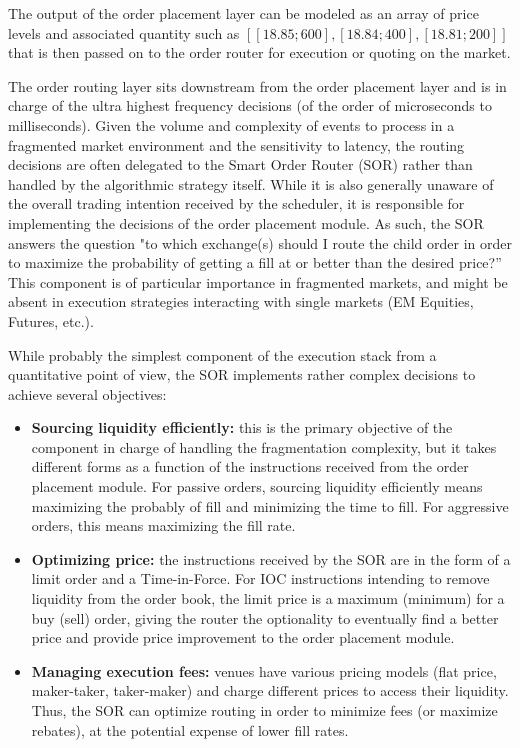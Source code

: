 The output of the order placement layer can be modeled as an array of price levels and associated quantity such as $[ [18.85 ; 600], [18.84 ; 400], [18.81 ; 200] ]$ that is then passed on to the order router for execution or quoting on the market.

The order routing layer sits downstream from the order placement layer and is in charge of the ultra highest frequency decisions (of the order of microseconds to milliseconds). Given the volume and complexity of events to process in a fragmented market environment and the sensitivity to latency, the routing decisions are often delegated to the Smart Order Router (SOR) rather than handled by the algorithmic strategy itself. While it is also generally unaware of the overall trading intention received by the scheduler, it is responsible for implementing the decisions of the order placement module. As such, the SOR answers the question "to which exchange(s) should I route the child order in order to maximize the probability of getting a fill at or better than the desired price?'' This component is of particular importance in fragmented markets, and might be absent in execution strategies interacting with single markets (EM Equities, Futures, etc.). 


While probably the simplest component of the execution stack from a quantitative point of view, the SOR implements rather complex decisions to achieve several objectives: 

\begin{itemize}
\item \textbf{Sourcing liquidity efficiently:} this is the primary objective of the component in charge of handling the fragmentation complexity, but it takes different forms as a function of the instructions received from the order placement module. For passive orders, sourcing liquidity efficiently means maximizing the probably of fill and minimizing the time to fill. For aggressive orders, this means maximizing the fill rate.
\item \textbf{Optimizing price:} the instructions received by the SOR are in the form of a limit order and a Time-in-Force. For IOC instructions intending to remove liquidity from the order book, the limit price is a maximum (minimum) for a buy (sell) order, giving the router the optionality to eventually find a better price and provide price improvement to the order placement module.
\item \textbf{Managing execution fees:} venues have various pricing models (flat price, maker-taker, taker-maker) and charge different prices to access their liquidity. Thus, the SOR can optimize routing in order to minimize fees (or maximize rebates), at the potential expense of lower fill rates.
\end{itemize}

